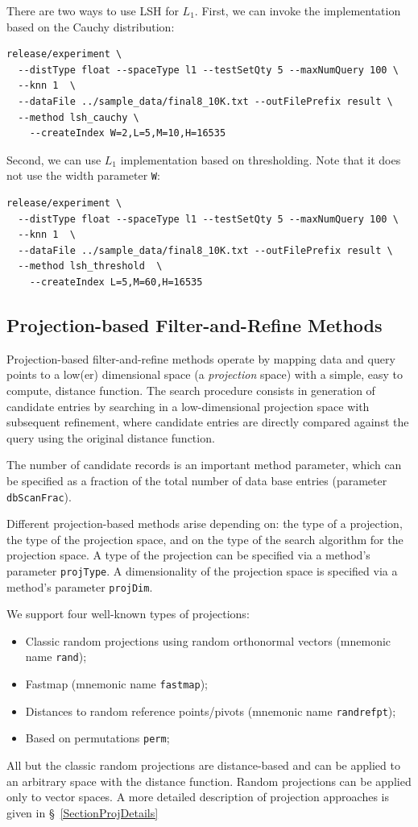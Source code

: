 \documentclass[runningheads,a4paper]{llncs}
\newcommand{\ttt}[1]{\texttt{#1}}
\begin{document}
{There are two ways to use LSH for $L_1$. First, 
we can invoke the implementation based on the Cauchy distribution:
{
\footnotesize
\begin{verbatim}
release/experiment \
  --distType float --spaceType l1 --testSetQty 5 --maxNumQuery 100 \
  --knn 1  \
  --dataFile ../sample_data/final8_10K.txt --outFilePrefix result \
  --method lsh_cauchy \
    --createIndex W=2,L=5,M=10,H=16535
\end{verbatim}
}

Second, we can use $L_1$ implementation based on thresholding.
Note that it does not use the width parameter \texttt{W}:
{
\footnotesize
\begin{verbatim}
release/experiment \
  --distType float --spaceType l1 --testSetQty 5 --maxNumQuery 100 \
  --knn 1  \
  --dataFile ../sample_data/final8_10K.txt --outFilePrefix result \
  --method lsh_threshold  \
    --createIndex L=5,M=60,H=16535
\end{verbatim}
}

\subsection{Projection-based Filter-and-Refine Methods}\label{SectionProjMethod}
Projection-based filter-and-refine methods operate by mapping data and query points
to a low(er) dimensional space (a \emph{projection} space) with a simple, 
easy to compute, distance function.
The search procedure consists in generation of candidate entries by searching
in a low-dimensional projection space with subsequent
refinement, where candidate entries are directly compared against the query
using the original distance function.

The number of candidate records is an important method parameter,
which can be specified as a fraction of the total number of data base entries
(parameter \ttt{dbScanFrac}). 

Different projection-based methods arise depending on: 
the type of a projection, the type of the projection space, 
and on the type of the search algorithm for the projection space.
A type of the projection can be specified via a method's parameter \ttt{projType}.
A dimensionality of the projection space is specified via a method's parameter \ttt{projDim}.

We support four well-known types of projections:
\begin{itemize}
\item Classic random projections using random orthonormal vectors (mnemonic name \ttt{rand});
\item Fastmap (mnemonic name \ttt{fastmap});
\item Distances to random reference points/pivots (mnemonic name \ttt{randrefpt});
\item Based on permutations \ttt{perm};
\end{itemize}
All but the classic random projections are distance-based and
can be applied to an arbitrary space with the distance function.
Random projections can be applied only to vector spaces.
A more detailed description of projection approaches is given in \S~\ref{SectionProjDetails}

}
\end{document}
